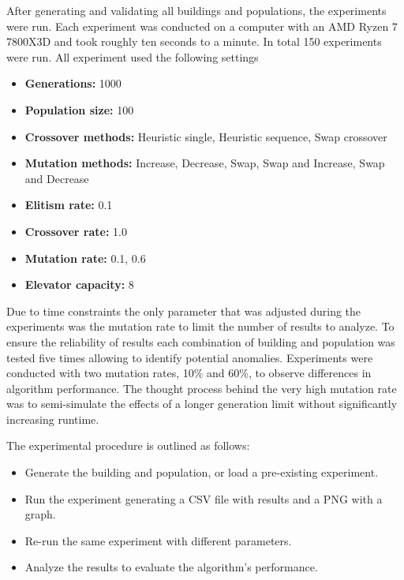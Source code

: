 After generating and validating all buildings and populations, the experiments were run. Each experiment was conducted on a computer with an AMD Ryzen 7 7800X3D and took roughly ten seconds to a minute. In total 150 experiments were run.
\newpage
All experiment used the following settings 

\begin{itemize}
    \item \textbf{Generations:} 1000
    \item \textbf{Population size:} 100
    \item \textbf{Crossover methods:} Heuristic single, Heuristic sequence, Swap crossover
    \item \textbf{Mutation methods:} Increase, Decrease, Swap, Swap and Increase, Swap and Decrease
    \item \textbf{Elitism rate:} 0.1
    \item \textbf{Crossover rate:} 1.0
    \item \textbf{Mutation rate:} 0.1, 0.6
	\item \textbf{Elevator capacity:} 8
\end{itemize}


Due to time constraints the only parameter that was adjusted during the experiments was the mutation rate to limit the number of results to analyze.
To ensure the reliability of results each combination of building and population was tested five times allowing to identify potential anomalies. Experiments were conducted with two mutation rates, 10\% and 60\%, to observe differences in algorithm performance.
The thought process behind the very high mutation rate was to semi-simulate the effects of a longer generation limit without significantly increasing runtime.

The experimental procedure is outlined as follows:

\begin{itemize}
	\item Generate the building and population, or load a pre-existing experiment.
	\item Run the experiment generating a CSV file with results and a PNG with a graph.
	\item Re-run the same experiment with different parameters.
	\item Analyze the results to evaluate the algorithm's performance.
\end{itemize}
